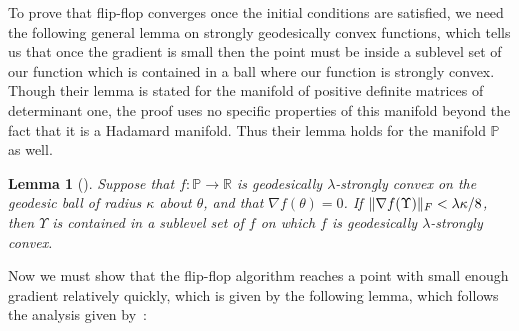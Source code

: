 \documentclass[aos]{imsart}
\newtheorem{lemma}[theorem]{Lemma}
\theoremstyle{definition}
\numberwithin{equation}{section}
\DeclarePairedDelimiter{\norm}{\lVert}{\rVert}
\newcommand{\R}{{\mathbb{R}}}
\newcommand{\SPD}{\mathbb{P}}
\begin{document}
To prove that flip-flop converges once the initial conditions are satisfied, we need the following general lemma \cite[Lemma 4.7]{FM20} on strongly geodesically convex functions, which tells us that once the gradient is small then the point must be inside a sublevel set of our function which is contained in a ball where our function is strongly convex. Though their lemma is stated for the manifold of positive definite matrices of determinant one, the proof uses no specific properties of this manifold beyond the fact that it is a Hadamard manifold. Thus their lemma holds for the manifold $\SPD$ as well.

\begin{lemma}[\cite{FM20}]\label{lem:gradient-strong-convexity-fm}
Suppose that $f : \SPD \to \R$ is geodesically $\lambda$-strongly convex on the geodesic ball of radius $\kappa$ about $\theta$, and that $\nabla f(\theta) = 0$. 
If $\norm{\nabla f(\Upsilon)}_F < \lambda \kappa/8$, then $\Upsilon$ is contained in a sublevel set of $f$ on which $f$ is geodesically $\lambda$-strongly convex.
\end{lemma}
Now we must show that the flip-flop algorithm reaches a point with small enough gradient relatively quickly, which is given by the following lemma, which follows the analysis given by~\cite{GGOW19}:
\end{document}
